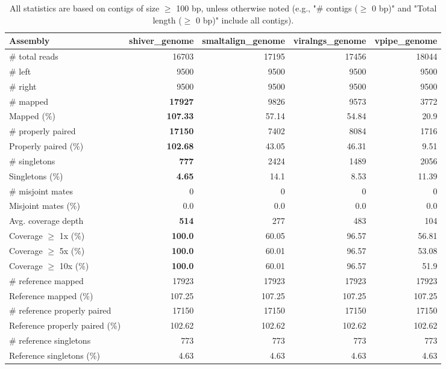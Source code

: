 \documentclass[12pt,a4paper]{article}
\begin{document}
\begin{table}[ht]
\begin{center}
\caption{All statistics are based on contigs of size $\geq$ 100 bp, unless otherwise noted (e.g., "\# contigs ($\geq$ 0 bp)" and "Total length ($\geq$ 0 bp)" include all contigs).}
\begin{tabular}{|l*{4}{|r}|}
\hline
Assembly & shiver\_genome & smaltalign\_genome & viralngs\_genome & vpipe\_genome \\ \hline
\# total reads & 16703 & 17195 & 17456 & 18044 \\ \hline
\# left & 9500 & 9500 & 9500 & 9500 \\ \hline
\# right & 9500 & 9500 & 9500 & 9500 \\ \hline
\# mapped & {\bf 17927} & 9826 & 9573 & 3772 \\ \hline
Mapped (\%) & {\bf 107.33} & 57.14 & 54.84 & 20.9 \\ \hline
\# properly paired & {\bf 17150} & 7402 & 8084 & 1716 \\ \hline
Properly paired (\%) & {\bf 102.68} & 43.05 & 46.31 & 9.51 \\ \hline
\# singletons & {\bf 777} & 2424 & 1489 & 2056 \\ \hline
Singletons (\%) & {\bf 4.65} & 14.1 & 8.53 & 11.39 \\ \hline
\# misjoint mates & 0 & 0 & 0 & 0 \\ \hline
Misjoint mates (\%) & 0.0 & 0.0 & 0.0 & 0.0 \\ \hline
Avg. coverage depth & {\bf 514} & 277 & 483 & 104 \\ \hline
Coverage $\geq$ 1x (\%) & {\bf 100.0} & 60.05 & 96.57 & 56.81 \\ \hline
Coverage $\geq$ 5x (\%) & {\bf 100.0} & 60.01 & 96.57 & 53.08 \\ \hline
Coverage $\geq$ 10x (\%) & {\bf 100.0} & 60.01 & 96.57 & 51.9 \\ \hline
\# reference mapped & 17923 & 17923 & 17923 & 17923 \\ \hline
Reference mapped (\%) & 107.25 & 107.25 & 107.25 & 107.25 \\ \hline
\# reference properly paired & 17150 & 17150 & 17150 & 17150 \\ \hline
Reference properly paired (\%) & 102.62 & 102.62 & 102.62 & 102.62 \\ \hline
\# reference singletons & 773 & 773 & 773 & 773 \\ \hline
Reference singletons (\%) & 4.63 & 4.63 & 4.63 & 4.63 \\ \hline

\end{tabular}
\end{center}
\end{table}
\end{document}
